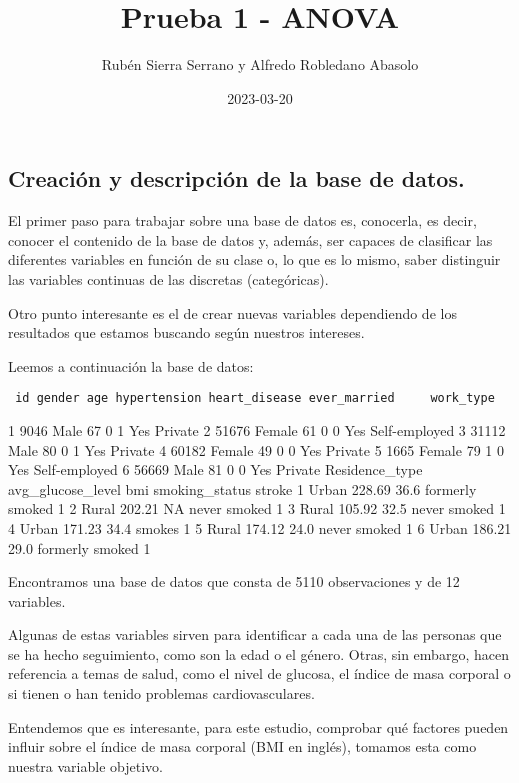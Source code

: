 \documentclass[
]{article}
\title{Prueba 1 - ANOVA}
\author{Rubén Sierra Serrano y Alfredo Robledano Abasolo}
\date{2023-03-20}
\begin{document}
\maketitle

\hypertarget{creaciuxf3n-y-descripciuxf3n-de-la-base-de-datos.}{%
\subsection{Creación y descripción de la base de
datos.}\label{creaciuxf3n-y-descripciuxf3n-de-la-base-de-datos.}}

El primer paso para trabajar sobre una base de datos es, conocerla, es
decir, conocer el contenido de la base de datos y, además, ser capaces
de clasificar las diferentes variables en función de su clase o, lo que
es lo mismo, saber distinguir las variables continuas de las discretas
(categóricas).

Otro punto interesante es el de crear nuevas variables dependiendo de
los resultados que estamos buscando según nuestros intereses.

Leemos a continuación la base de datos:

\begin{verbatim}
 id gender age hypertension heart_disease ever_married     work_type
\end{verbatim}

1 9046 Male 67 0 1 Yes Private 2 51676 Female 61 0 0 Yes Self-employed 3
31112 Male 80 0 1 Yes Private 4 60182 Female 49 0 0 Yes Private 5 1665
Female 79 1 0 Yes Self-employed 6 56669 Male 81 0 0 Yes Private
Residence\_type avg\_glucose\_level bmi smoking\_status stroke 1 Urban
228.69 36.6 formerly smoked 1 2 Rural 202.21 NA never smoked 1 3 Rural
105.92 32.5 never smoked 1 4 Urban 171.23 34.4 smokes 1 5 Rural 174.12
24.0 never smoked 1 6 Urban 186.21 29.0 formerly smoked 1

Encontramos una base de datos que consta de 5110 observaciones y de 12
variables.

Algunas de estas variables sirven para identificar a cada una de las
personas que se ha hecho seguimiento, como son la edad o el género.
Otras, sin embargo, hacen referencia a temas de salud, como el nivel de
glucosa, el índice de masa corporal o si tienen o han tenido problemas
cardiovasculares.

Entendemos que es interesante, para este estudio, comprobar qué factores
pueden influir sobre el índice de masa corporal (BMI en inglés), tomamos
esta como nuestra variable objetivo.
\end{document}
